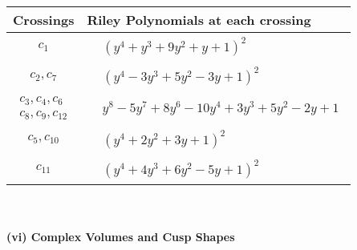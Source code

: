 \documentclass[1p]{elsarticle_modified}
\theoremstyle{definition}
\begin{document}
\begin{tabular}{m{50pt}|m{274pt}}
Crossings & \hspace{64pt}Riley Polynomials at each crossing \\
\hline $$\begin{aligned}c_{1}\end{aligned}$$&$\begin{aligned}
&(y^4+y^3+9 y^2+y+1)^2
\end{aligned}$\\
\hline $$\begin{aligned}c_{2},c_{7}\end{aligned}$$&$\begin{aligned}
&(y^4-3 y^3+5 y^2-3 y+1)^2
\end{aligned}$\\
\hline $$\begin{aligned}c_{3},c_{4},c_{6}\\c_{8},c_{9},c_{12}\end{aligned}$$&$\begin{aligned}
&y^8-5 y^7+8 y^6-10 y^4+3 y^3+5 y^2-2 y+1
\end{aligned}$\\
\hline $$\begin{aligned}c_{5},c_{10}\end{aligned}$$&$\begin{aligned}
&(y^4+2 y^2+3 y+1)^2
\end{aligned}$\\
\hline $$\begin{aligned}c_{11}\end{aligned}$$&$\begin{aligned}
&(y^4+4 y^3+6 y^2-5 y+1)^2
\end{aligned}$\\
\hline
\end{tabular}\\~\\
\newpage\flushleft \textbf{(vi) Complex Volumes and Cusp Shapes}
\end{document}
